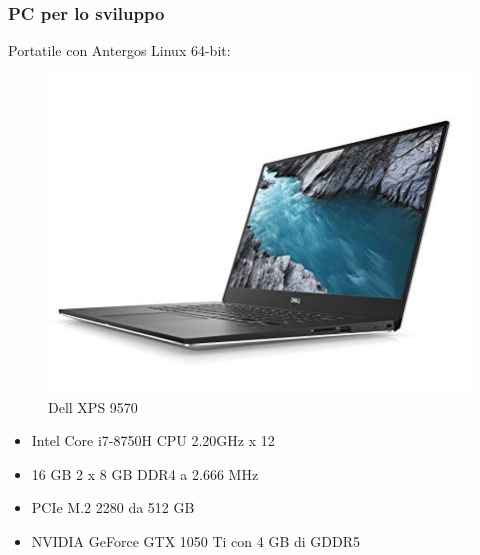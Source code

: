 \documentclass[twoside]{supsistudent}
\begin{document}
\subsubsection{PC per lo sviluppo}
Portatile con Antergos Linux 64-bit:
\begin{figure}[H]
  \center
  \includegraphics[scale=0.4]{images/pc.jpg}
  \caption{Dell XPS 9570}
\end{figure}
\begin{itemize}
  \item Intel Core i7-8750H CPU 2.20GHz x 12
  \item 16 GB 2 x 8 GB DDR4 a 2.666 MHz
  \item PCIe M.2 2280 da 512 GB
  \item NVIDIA GeForce GTX 1050 Ti con 4 GB di GDDR5
\end{itemize}
\end{document}
